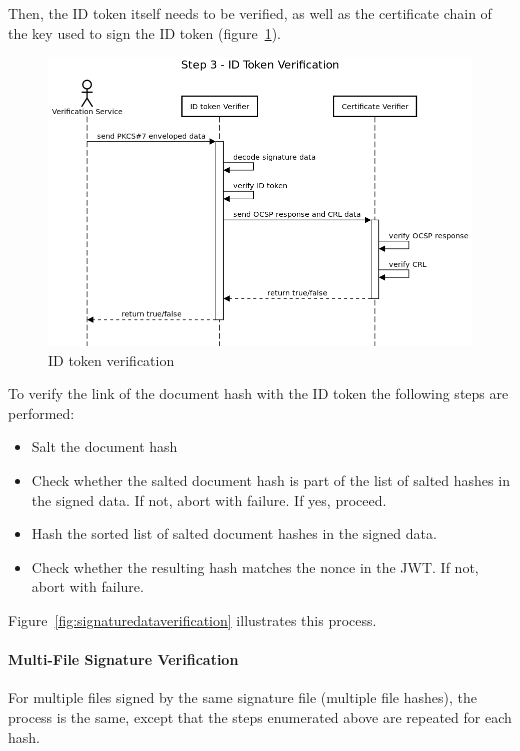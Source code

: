 Then, the ID token itself needs to be verified,
as well as the certificate chain of the key used to sign the ID token (figure~\ref{fig:idtokenverification}).

\begin{figure}[H]
    \begin{center}
        \includegraphics[scale=0.48]{images/protocol_verification_step3_id_token.png}
        \caption{ID token verification}
        \label{fig:idtokenverification}
    \end{center}
\end{figure}

To verify the link of the document hash with the ID token the following steps are performed:
\begin{itemize}
    \item Salt the document hash
    \item Check whether the salted document hash is part of the list of salted hashes in the signed data. If not, abort with failure. If yes, proceed.
    \item Hash the sorted list of salted document hashes in the signed data.
    \item Check whether the resulting hash matches the nonce in the \gls{JWT}. If not, abort with failure.
\end{itemize}

Figure~\ref{fig:signaturedataverification} illustrates this process.

\paragraph{Multi-File Signature Verification}
For multiple files signed by the same signature file (multiple file hashes),
the process is the same,
except that the steps enumerated above are repeated for each hash.

